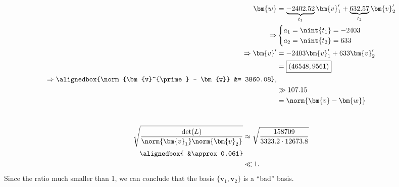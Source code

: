 \documentclass[
  coursecode={MTHE 418},
  assignmentname={Homework \homeworknumber},
  studentnumber=20053722,
  name={Bryan Hoang},
  draft,
]{
  ltxanswer%
}
\begin{document}
\begin{questions}
\begin{parts}
      \part{}
      \begin{solution}
        \begin{align*}
          \bm{w}                                                  &= \underbrace{-2402.52}_{t_{1}} \bm{v}_{1}^{\prime} + \underbrace{632.57}_{t_{2}} \bm{v}_{2}^{\prime} \\
          \Rightarrow                                             &\begin{cases}
                                                                     a_{1} = \nint{t_{1}} = -2403 \\
                                                                     a_{2} = \nint{t_{2}} = 633
                                                                   \end{cases}                                                  \\
          \Rightarrow \bm{v}^{\prime}                             &= -2403 \bm{v}_{1}^{\prime} + 633 \bm{v}_{2}^{\prime}                                                 \\
                                                                  &= \boxed{(46548, 9561)}                                                                               \\
          \Rightarrow \alignedbox{\norm{\bm{v}^{\prime} - \bm{w}} &= 3860.08},                                                                                           \\
                                                                  &\gg 107.15                                                                                            \\
                                                                  &= \norm{\bm{v} - \bm{w}}
        \end{align*}
      \end{solution}

      \part{}
      \begin{solution}
        \begin{align*}
          \sqrt{\frac{\det(L)}{\norm{\bm{v}_{1}} \norm{\bm{v}_{2}}}} &\approx \sqrt{\frac{158709}{3323.2 \cdot 12673.8}} \\
          \alignedbox{                                               &\approx 0.061}                                     \\
                                                                     &\ll 1.
        \end{align*}
        Since the ratio much smaller than 1, we can conclude that the basis \(\{\bm{v}_{1}, \bm{v}_{2}\}\) is a ``bad'' basis.
      \end{solution}
    \end{parts}
  \end{questions}
\end{document}
